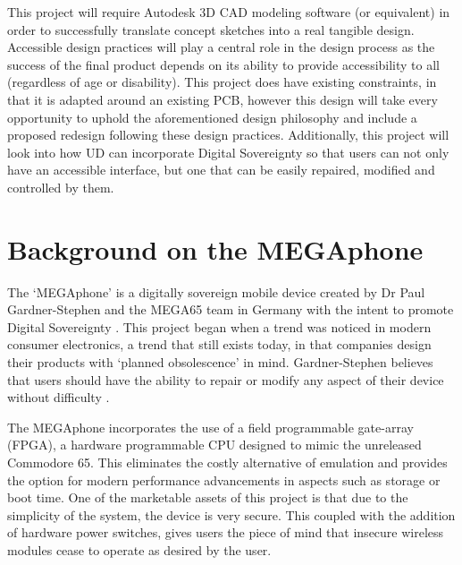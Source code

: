 This project will require Autodesk 3D CAD modeling software (or equivalent) in order to successfully translate concept sketches into a real tangible design. 
Accessible design practices will play a central role in the design process as the success of the final product depends on its ability to provide accessibility to all (regardless of age or disability). 
This project does have existing constraints, in that it is adapted around an existing PCB, however this design will take every opportunity to uphold the aforementioned design philosophy and include a proposed redesign following these design practices.
Additionally, this project will look into how UD can incorporate Digital Sovereignty so that users can not only have an accessible interface, but one that can be easily repaired, modified and controlled by them.


\section{Background on the MEGAphone}

The ‘MEGAphone’ is a digitally sovereign mobile device created by Dr Paul Gardner-Stephen and the MEGA65 team in Germany with the intent to promote Digital Sovereignty \cite{mega65}.
This project began when a trend was noticed in modern consumer electronics, a trend that still exists today, in that companies design their products with ‘planned obsolescence’ in mind. 
Gardner-Stephen believes that users should have the ability to repair or modify any aspect of their device without difficulty \cite{mobilehistory}.

The MEGAphone incorporates the use of a field programmable gate-array (FPGA), a hardware programmable CPU designed to mimic the unreleased Commodore 65.
This eliminates the costly alternative of emulation and provides the option for modern performance advancements in aspects such as storage or boot time.
One of the marketable assets of this project is that due to the simplicity of the system, the device is very secure.
This coupled with the addition of hardware power switches, gives users the piece of mind that insecure wireless modules cease to operate as desired by the user.

